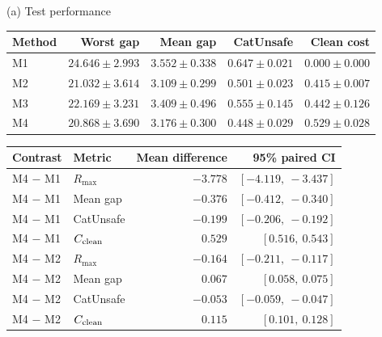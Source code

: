 {(a) Test performance}\par\smallskip
\begin{tabular}{@{}lrrrr@{}}
\toprule
Method & Worst gap & Mean gap & CatUnsafe & Clean cost \\
\midrule
M1 & $24.646 \pm 2.993$ & $3.552 \pm 0.338$ & $0.647 \pm 0.021$ & $0.000 \pm 0.000$ \\
M2 & $21.032 \pm 3.614$ & $3.109 \pm 0.299$ & $0.501 \pm 0.023$ & $0.415 \pm 0.007$ \\
M3 & $22.169 \pm 3.231$ & $3.409 \pm 0.496$ & $0.555 \pm 0.145$ & $0.442 \pm 0.126$ \\
M4 & $20.868 \pm 3.690$ & $3.176 \pm 0.300$ & $0.448 \pm 0.029$ & $0.529 \pm 0.028$ \\
\bottomrule
\end{tabular}

\par\smallskip
\begin{tabular}{@{}llrr@{}}
\toprule
Contrast & Metric & Mean difference & 95\% paired CI \\
\midrule
M4 $-$ M1 & $R_{\max}$ & $-3.778$ & $[-4.119,\ -3.437]$ \\
M4 $-$ M1 & Mean gap & $-0.376$ & $[-0.412,\ -0.340]$ \\
M4 $-$ M1 & CatUnsafe & $-0.199$ & $[-0.206,\ -0.192]$ \\
M4 $-$ M1 & $C_{\rm clean}$ & $0.529$ & $[0.516,\ 0.543]$ \\
M4 $-$ M2 & $R_{\max}$ & $-0.164$ & $[-0.211,\ -0.117]$ \\
M4 $-$ M2 & Mean gap & $0.067$ & $[0.058,\ 0.075]$ \\
M4 $-$ M2 & CatUnsafe & $-0.053$ & $[-0.059,\ -0.047]$ \\
M4 $-$ M2 & $C_{\rm clean}$ & $0.115$ & $[0.101,\ 0.128]$ \\
\bottomrule
\end{tabular}
